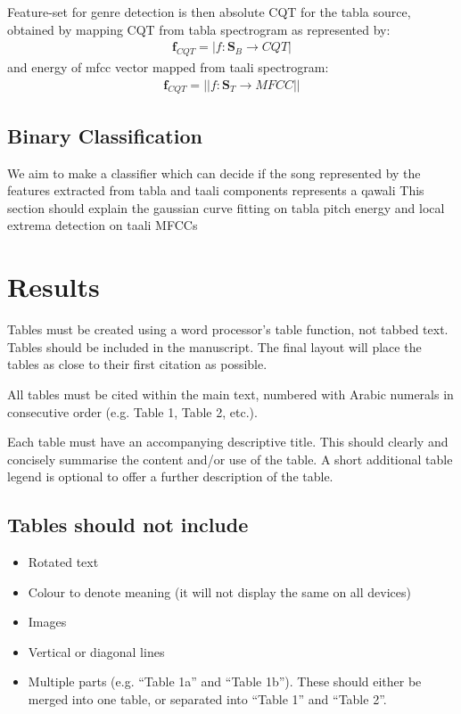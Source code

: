 \documentclass{article}
\begin{document}
Feature-set for genre detection is then absolute CQT for the tabla source, obtained by mapping CQT from tabla spectrogram as represented by:
\begin{align}\label{eq:eq}
\boldsymbol{f}_{CQT} = \lvert f\colon \boldsymbol{S}_{B}\to CQT \rvert
\end{align}
and energy of mfcc vector mapped from taali spectrogram:
\begin{align}\label{eq:eq}
\boldsymbol{f}_{CQT} = \lvert \lvert {f\colon \boldsymbol{S}_{T}\to MFCC} \rvert \rvert
\end{align}

\subsection{Binary Classification}
We aim to make a classifier which can decide if the song represented by the features extracted from tabla and taali components represents a qawali
This section should explain the gaussian curve fitting on tabla pitch energy and local extrema detection on taali MFCCs



\section{Results}\label{sec:result}

Tables must be created using a word processor's table function,
not tabbed text.
Tables should be included in the manuscript.
The final layout will place the tables as close to their first
citation as possible.

All tables must be cited within the main text, numbered with Arabic
numerals in consecutive order (e.g. Table 1, Table 2, etc.).

Each table must have an accompanying descriptive title.
This should clearly and concisely summarise the content and/or
use of the table.
A short additional table legend is optional to offer a further
description of the table.

\subsection{Tables should not include}

\begin{itemize}
  \item Rotated text
  \item Colour to denote meaning (it will not display the same on all devices)
  \item Images
  \item Vertical or diagonal lines
  \item Multiple parts (e.g. ``Table 1a'' and ``Table 1b'').
  These should either be merged into one table,
  or separated into ``Table 1'' and ``Table 2''.
\end{itemize}
\end{document}
